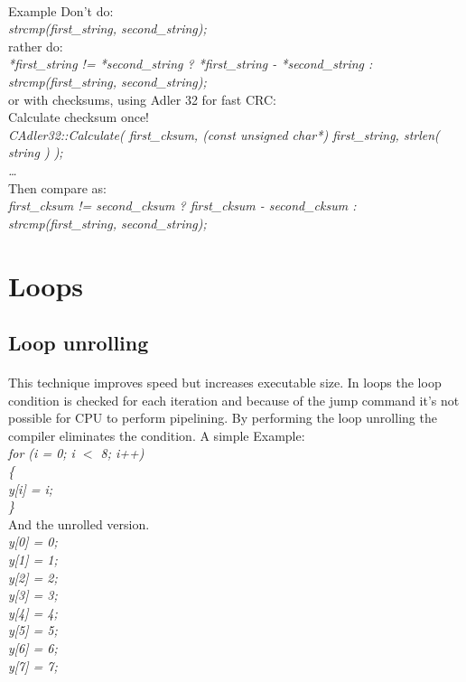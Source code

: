 \documentclass{article}
\begin{document}
 \paragraph{}{Example}
Don't do:\\ 
 \emph{strcmp(first\_string, second\_string); }\\

rather do: \\
 \emph{ *first\_string != *second\_string ? *first\_string - *second\_string :  strcmp(first\_string, second\_string); }\\

or with checksums, using Adler 32 for fast CRC: \\
 Calculate checksum once! \\
 \emph{  CAdler32::Calculate( first\_cksum, (const unsigned char*) first\_string, strlen( string ) ); }\\
 \emph{ \ldots }\\
 Then compare as:\\
 \emph{
 first\_cksum != second\_cksum ? first\_cksum - second\_cksum : strcmp(first\_string, second\_string);
 }

\section {Loops}

 \subsection{Loop unrolling}
 \paragraph{}
 This technique improves speed but increases executable size. 
 In loops the loop condition is checked for each iteration and because of the jump command it's not possible for CPU to perform pipelining.
 By performing the loop unrolling the compiler eliminates the condition. A simple Example:\\
 \emph{
 for (i = 0; i $<$ 8; i++)\\
   \{ \\
     y[i] = i;\\
  \}\\
 }  
 And the unrolled version.\\
 \emph{
 y[0] = 0;\\
 y[1] = 1;\\
 y[2] = 2;\\
 y[3] = 3;\\
 y[4] = 4;\\
 y[5] = 5;\\
 y[6] = 6;\\
 y[7] = 7;\\
 }
 
\end{document}
